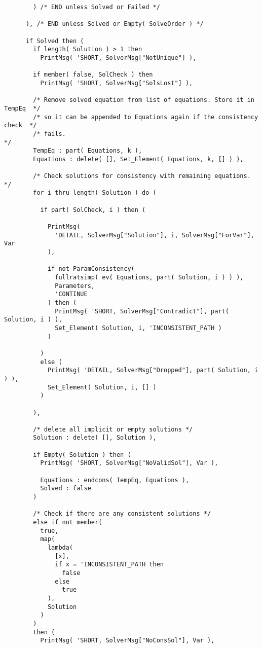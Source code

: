 \begin{verbatim}
        ) /* END unless Solved or Failed */

      ), /* END unless Solved or Empty( SolveOrder ) */

      if Solved then (
        if length( Solution ) > 1 then
          PrintMsg( 'SHORT, SolverMsg["NotUnique"] ),

        if member( false, SolCheck ) then
          PrintMsg( 'SHORT, SolverMsg["SolsLost"] ),

        /* Remove solved equation from list of equations. Store it in TempEq  */
        /* so it can be appended to Equations again if the consistency check  */
        /* fails.                                                             */
        TempEq : part( Equations, k ),
        Equations : delete( [], Set_Element( Equations, k, [] ) ),

        /* Check solutions for consistency with remaining equations. */
        for i thru length( Solution ) do (

          if part( SolCheck, i ) then (

            PrintMsg(
              'DETAIL, SolverMsg["Solution"], i, SolverMsg["ForVar"], Var
            ),

            if not ParamConsistency(
              fullratsimp( ev( Equations, part( Solution, i ) ) ),
              Parameters,
              'CONTINUE
            ) then (
              PrintMsg( 'SHORT, SolverMsg["Contradict"], part( Solution, i ) ),
              Set_Element( Solution, i, 'INCONSISTENT_PATH )
            )

          )
          else (
            PrintMsg( 'DETAIL, SolverMsg["Dropped"], part( Solution, i ) ),
            Set_Element( Solution, i, [] )
          )

        ),

        /* delete all implicit or empty solutions */
        Solution : delete( [], Solution ),

        if Empty( Solution ) then (
          PrintMsg( 'SHORT, SolverMsg["NoValidSol"], Var ),

          Equations : endcons( TempEq, Equations ),
          Solved : false
        ) 

        /* Check if there are any consistent solutions */
        else if not member( 
          true, 
          map( 
            lambda( 
              [x], 
              if x = 'INCONSISTENT_PATH then
                false
              else
                true
            ), 
            Solution
          ) 
        ) 
        then (
          PrintMsg( 'SHORT, SolverMsg["NoConsSol"], Var ),


\end{verbatim}

